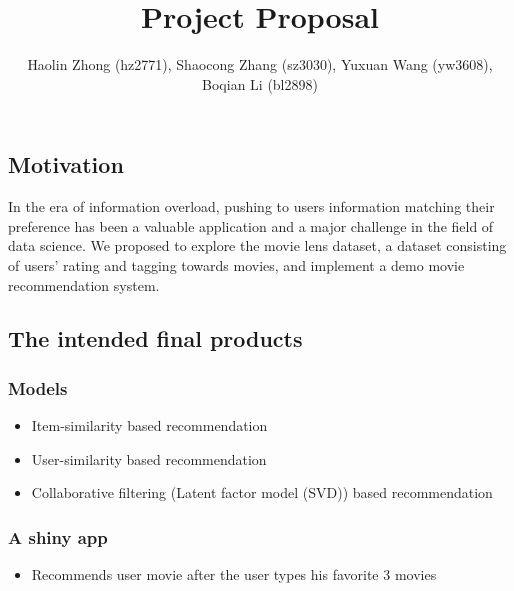 \documentclass[
]{article}
\title{\textbf{Project Proposal}}
\author{Haolin Zhong (hz2771), Shaocong Zhang (sz3030), Yuxuan Wang
(yw3608), Boqian Li (bl2898)}
\date{}
\providecommand{\tightlist}{%
  \setlength{\itemsep}{0pt}\setlength{\parskip}{0pt}}
\begin{document}
\maketitle


\hypertarget{motivation}{%
\subsection{Motivation}\label{motivation}}

In the era of information overload, pushing to users information
matching their preference has been a valuable application and a major
challenge in the field of data science. We proposed to explore the movie
lens dataset, a dataset consisting of users' rating and tagging towards
movies, and implement a demo movie recommendation system.

\hypertarget{the-intended-final-products}{%
\subsection{The intended final
products}\label{the-intended-final-products}}

\hypertarget{models}{%
\subsubsection{Models}\label{models}}

\begin{itemize}
\item
  Item-similarity based recommendation
\item
  User-similarity based recommendation
\item
  Collaborative filtering (Latent factor model (SVD)) based
  recommendation
\end{itemize}

\hypertarget{a-shiny-app}{%
\subsubsection{A shiny app}\label{a-shiny-app}}

\begin{itemize}
\tightlist
\item
  Recommends user movie after the user types his favorite 3 movies
\end{itemize}
\end{document}
